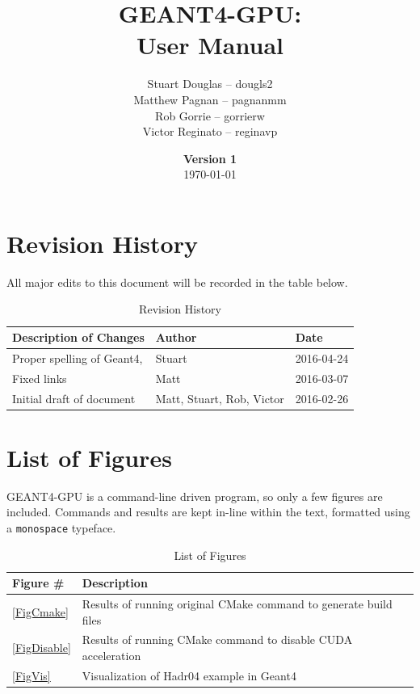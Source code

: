 \documentclass[12pt]{article}
\title{
\LARGE GEANT4-GPU:
\\\vspace{10mm}
\large \textbf{User Manual}
\vspace{40mm}
}
\author{
Stuart Douglas -- dougls2
\\Matthew Pagnan -- pagnanmm
\\Rob Gorrie -- gorrierw
\\Victor Reginato -- reginavp
\vspace{10mm}
}
\date{\vfill \textbf{Version 1}\\ \today}
\begin{document}

\maketitle
\newpage

\tableofcontents
\newpage
{}
\restoregeometry

\section{Revision History}
All major edits to this document will be recorded in the table below.

\begin{table}[h]
\centering
\caption{Revision History}\label{Table_Revision}
\begin{tabular}{lll}
\toprule
\bf Description of Changes & \bf Author & \bf Date\\\midrule
Proper spelling of Geant4, & Stuart & 2016-04-24\\
Fixed links & Matt & 2016-03-07\\
Initial draft of document & Matt, Stuart, Rob, Victor  & 2016-02-26\\
\bottomrule
\end{tabular}
\end{table}

\section{List of Figures}
GEANT4-GPU is a command-line driven program, so only a few figures are included. Commands and results are kept in-line within the text, formatted using a \texttt{monospace} typeface.

\begin{table}[h]
\centering
\caption{List of Figures}
\begin{tabular}{ll}
\toprule
\textbf{Figure \#} & \textbf{Description}\\\midrule
\ref{FigCmake} & Results of running original CMake command to generate build files\\
\ref{FigDisable} & Results of running CMake command to disable CUDA acceleration\\
\ref{FigVis} & Visualization of Hadr04 example in Geant4\\
\bottomrule
\end{tabular}
\end{table}
\end{document}
